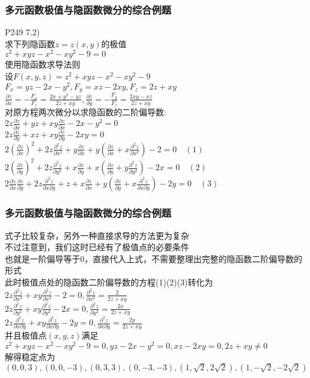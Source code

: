 \documentclass[xetex]{beamer}
\begin{document}
\begin{frame}
	\frametitle{多元函数极值与隐函数微分的综合例题}
	P249 7.2)\\
	求下列隐函数$z=z(x,y)$的极值\\
	$z^2+xyz-x^2-xy^2-9=0$\\ \pause
	使用隐函数求导法则\\
	设$F(x,y,z)=z^2+xyz-x^2-xy^2-9$\\
	$F_x=yz-2x-y^2,F_y=xz-2xy,F_z=2z+xy$\\ \pause
	$\frac{\partial z}{\partial x}=-\frac{F_x}{F_z}=\frac{2x+y^2-yz}{2z+xy},\frac{\partial z}{\partial y}=-\frac{F_y}{F_z}=\frac{2xy-xz}{2z+xy}$\\ \pause
	对原方程两次微分以求隐函数的二阶偏导数:\\
	$2z\frac{\partial z}{\partial x}+yz+xy\frac{\partial z}{\partial x}-2x-y^2=0$\\$ 
	2z\frac{\partial z}{\partial y}+xz+xy\frac{\partial z}{\partial y}-2xy=0$\\ \pause
	$2(\frac{\partial z}{\partial x})^2+2z\frac{\partial^2 z}{\partial x^2}+y\frac{\partial z}{\partial x}+y(\frac{\partial z}{\partial x}+x\frac{\partial^2 z}{\partial x^2})-2=0\quad(1)$\\\pause
	$2(\frac{\partial z}{\partial y})^2+2z\frac{\partial^2 z}{\partial y^2}+x\frac{\partial z}{\partial y}+x(\frac{\partial z}{\partial y}+y\frac{\partial^2 z}{\partial y^2})-2x=0\quad(2)$\\\pause
	$2\frac{\partial z}{\partial x}\frac{\partial z}{\partial y}+2z\frac{\partial^2 z}{\partial x\partial y}+z+x\frac{\partial z}{\partial x}+y(\frac{\partial z}{\partial y}+x\frac{\partial^2 z}{\partial x\partial y})-2y=0\quad(3)$\\

	
\end{frame}

\begin{frame}
	\frametitle{多元函数极值与隐函数微分的综合例题}
	式子比较复杂，另外一种直接求导的方法更为复杂\\
	不过注意到，我们这时已经有了极值点的必要条件\\\pause
	也就是一阶偏导等于0，直接代入上式，不需要整理出完整的隐函数二阶偏导数的形式\\\pause
	此时极值点处的隐函数二阶偏导数的方程(1)(2)(3)转化为\\\pause
	$2z\frac{\partial^2 z}{\partial x^2}+xy\frac{\partial^2 z}{\partial x^2}-2=0,\frac{\partial^2 z}{\partial x^2}=\frac{2}{2z+xy}$\\\pause
	$2z\frac{\partial^2 z}{\partial y^2}+xy\frac{\partial^2 z}{\partial y^2}-2x=0,\frac{\partial^2 z}{\partial y^2}=\frac{2x}{2z+xy}$\\\pause
	$2z\frac{\partial^2 z}{\partial x\partial y}+xy\frac{\partial^2 z}{\partial x\partial y}-2y=0,\frac{\partial^2 z}{\partial x\partial y}=\frac{2y}{2z+xy}$\\\pause
	并且极值点$(x,y,z)$满足$z^2+xyz-x^2-xy^2-9=0,yz-2x-y^2=0,xz-2xy=0,2z+xy\not=0$\\
	解得稳定点为$(0,0,3),(0,0,-3),(0,3,3),(0,-3,-3),(1,\sqrt{2},2\sqrt{2}),(1,-\sqrt{2},-2\sqrt{2})$\pause

\end{frame}
\end{document}
